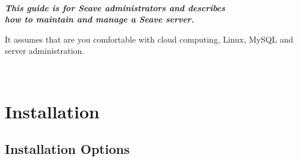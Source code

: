 \documentclass[11pt, a4paper]{article}
\begin{document}




\newpage

~
\vfill

\begin{center}
	\Large\bfseries\itshape
	This guide is for Seave administrators and describes\\ how to maintain and manage a Seave server.
	
	\vspace{2\baselineskip} 

	It assumes that are you comfortable with cloud computing, Linux, MySQL and server administration.
\end{center}

\vfill\vfill
~

\newpage


\tableofcontents %





\newpage

\section{Installation}

\subsection{Installation Options}
\end{document}
